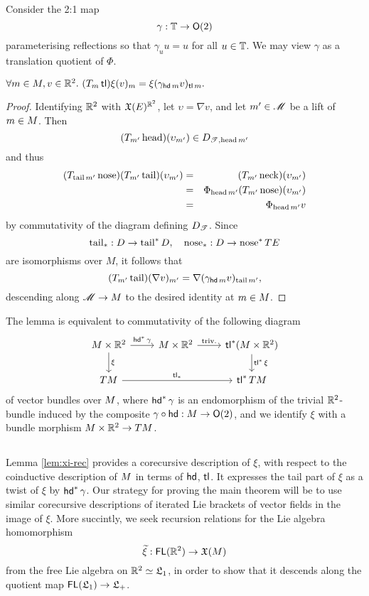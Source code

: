 \subsection{}
Consider the 2:1 map 
\[
        \gamma : {\mathbb{T}} \to \mathsf{O}(2)
\]
parameterising reflections so that $\gamma_u u = u$ for all $u\in{\mathbb{T}}$. We may
view $\gamma$ as a translation quotient of $\Phi$. 
\begin{lem}\label{lem:xi-rec}
$\forall m \in M, v \in {\mathbb{R}}^2.\ (T_m \operatorname{\mathsf{tl}})\xi(v)_m = \xi(\gamma_{\operatorname{\mathsf{hd}} m} v)_{\operatorname{\mathsf{tl}} m}.$
\end{lem}
\begin{proof}
Identifying ${\mathbb{R}}^2$ with $\mathfrak{X}(E)^{{\mathbb{R}}^2}$, let $\upsilon=\nabla v$, and let $m' \in\mathscr{M}$ be a 
lift of $m \in M$. Then
\[
        (T_{m'} \operatorname{\mathrm{head}})(\upsilon_{m'}) \in D_{\mathscr{T},\operatorname{\mathrm{head}} m'}
\]
and thus
\begin{eqnarray*}
        (T_{\operatorname{\mathrm{tail}} m'}\operatorname{\mathrm{nose}})(T_{m'} \operatorname{\mathrm{tail}})(\upsilon_{m'}) &=& (T_{m'} \operatorname{\mathrm{neck}})(\upsilon_{m'}) \\
                                                         &=& \Phi_{\operatorname{\mathrm{head}} m'} (T_{m'} \operatorname{\mathrm{nose}})(\upsilon_{m'}) \\
                                                         &=& \Phi_{\operatorname{\mathrm{head}} m'} v
\end{eqnarray*}
by commutativity of the diagram defining $D_{\mathscr{T}}$. Since 
\[
    \operatorname{\mathrm{tail}}_* : D \to \operatorname{\mathrm{tail}}^* D,\quad
    \operatorname{\mathrm{nose}}_* : D \to \operatorname{\mathrm{nose}}^* TE 
\]
are isomorphisms over $M$, it follows that 
\[
        (T_{m'} \operatorname{\mathrm{tail}})(\nabla v)_{m'} = \nabla(\gamma_{\operatorname{\mathsf{hd}} m} v)_{\operatorname{\mathrm{tail}} m'},
\] 
descending along $\mathscr{M}\to M$ to the desired identity at $m\in M$.
\end{proof}
The lemma is equivalent to commutativity of the following diagram
\[\begin{tikzcd}
        \Mr\times\RR^2 \arrow[r,"\hd^*\gamma"]\arrow[d,"\xi"] 
        &  \Mr\times\RR^2 \arrow[r,"\mathrm{triv.}"] & \tl^* (\Mr\times\RR^2) 
        \arrow[d,"\tl^*\xi"] \\
        T\Mr \arrow[rr,"\tl_*"] & &  \tl^* T\Mr
\end{tikzcd}\]
of vector bundles over $M$, where $\operatorname{\mathsf{hd}}^*\gamma$ is an endomorphism of the
trivial ${\mathbb{R}}^2$-bundle induced by the composite $\gamma\circ\operatorname{\mathsf{hd}} : M\to\mathsf{O}(2)$,
and we identify $\xi$ with a bundle morphism $M\times{\mathbb{R}}^2\to TM$.

\subsection{}
Lemma \ref{lem:xi-rec} provides a corecursive description of $\xi$, with respect to
the coinductive description of $M$ in terms of $\operatorname{\mathsf{hd}}$, $\operatorname{\mathsf{tl}}$. It expresses 
the tail part of $\xi$ as a twist of $\xi$ by $\operatorname{\mathsf{hd}}^* \gamma$. Our strategy for proving
the main theorem will be to use similar corecursive descriptions of
iterated Lie brackets of vector fields in the image of $\xi$. More succintly,
we seek recursion relations for the Lie algebra homomorphism 
\[
  \widetilde{\xi} : \operatorname{\mathsf{FL}}({\mathbb{R}}^2) \to \mathfrak{X}(M)
\]
from the free Lie algebra on ${\mathbb{R}}^2\simeq\mathfrak{L}_1$, in order to show that it descends
along the quotient map $\operatorname{\mathsf{FL}}(\mathfrak{L}_1) \to\mathfrak{L}_+$. 

